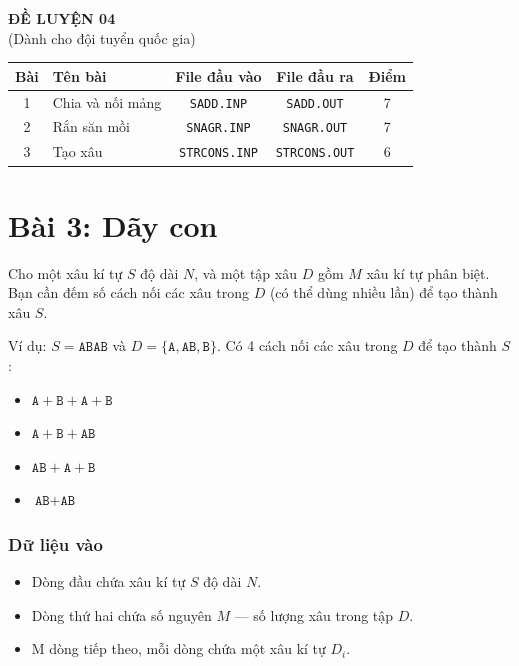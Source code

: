 \begin{center}
    {\LARGE \textbf{ĐỀ LUYỆN 04}}\\[6pt]
    {\large (Dành cho đội tuyển quốc gia)}
\end{center}

\begin{tabularx}{\textwidth}{|c|X|c|c|c|}
\hline
\textbf{Bài} & \textbf{Tên bài} & \textbf{File đầu vào} & \textbf{File đầu ra} & \textbf{Điểm} \\
\hline
1 & Chia và nối mảng & \texttt{SADD.INP} & \texttt{SADD.OUT} & 7 \\
\hline
2 & Rắn săn mồi & \texttt{SNAGR.INP} & \texttt{SNAGR.OUT} & 7 \\
\hline
3 & Tạo xâu & \texttt{STRCONS.INP} & \texttt{STRCONS.OUT} & 6 \\
\hline
\end{tabularx}



\section*{Bài 3: Dãy con}

Cho một xâu kí tự $S$ độ dài $N$, và một tập xâu $D$ gồm $M$ xâu kí tự phân biệt. Bạn cần đếm số cách nối các xâu trong $D$ (có thể dùng nhiều lần) để tạo thành xâu $S$.

Ví dụ: $S = \texttt{ABAB}$ và $D = \{\texttt{A}, \texttt{AB}, \texttt{B}\}$. Có 4 cách nối các xâu trong $D$ để tạo thành $S$:

\begin{itemize}
  \item $\texttt{A} + \texttt{B} + \texttt{A} + \texttt{B}$
  \item $\texttt{A} + \texttt{B} + \texttt{AB}$
  \item $\texttt{AB} + \texttt{A} + \texttt{B}$
  \item $\texttt{AB} + \texttt{AB}$
\end{itemize}

\subsubsection*{Dữ liệu vào}

\begin{itemize}
    \item Dòng đầu chứa xâu kí tự $S$ độ dài $N$.
    \item Dòng thứ hai chứa số nguyên $M$ — số lượng xâu trong tập $D$.
    \item M dòng tiếp theo, mỗi dòng chứa một xâu kí tự $D_i$.
\end{itemize}

